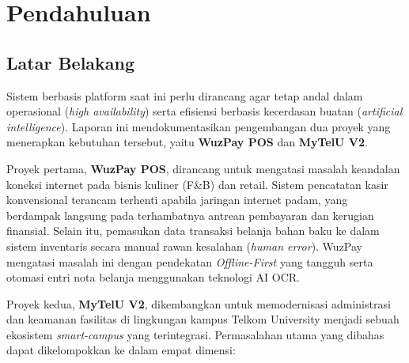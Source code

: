 \documentclass[12pt,titlepage,a4paper]{report}
\begin{document}
\clearpage
{}
\tableofcontents
\clearpage
{}

\chapter{Pendahuluan}

\section{Latar Belakang}
Sistem berbasis platform saat ini perlu dirancang agar tetap andal dalam operasional (\textit{high availability}) serta efisiensi berbasis kecerdasan buatan (\textit{artificial intelligence}). Laporan ini mendokumentasikan pengembangan dua proyek yang menerapkan kebutuhan tersebut, yaitu \textbf{WuzPay POS} dan \textbf{MyTelU V2}.

Proyek pertama, \textbf{WuzPay POS}, dirancang untuk mengatasi masalah keandalan koneksi internet pada bisnis kuliner (F\&B) dan retail. Sistem pencatatan kasir konvensional terancam terhenti apabila jaringan internet padam, yang berdampak langsung pada terhambatnya antrean pembayaran dan kerugian finansial. Selain itu, pemasukan data transaksi belanja bahan baku ke dalam sistem inventaris secara manual rawan kesalahan (\textit{human error}). WuzPay mengatasi masalah ini dengan pendekatan \textit{Offline-First} yang tangguh serta otomasi entri nota belanja menggunakan teknologi AI OCR.

Proyek kedua, \textbf{MyTelU V2}, dikembangkan untuk memodernisasi administrasi dan keamanan fasilitas di lingkungan kampus Telkom University menjadi sebuah ekosistem \textit{smart-campus} yang terintegrasi. Permasalahan utama yang dibahas dapat dikelompokkan ke dalam empat dimensi:
\end{document}
